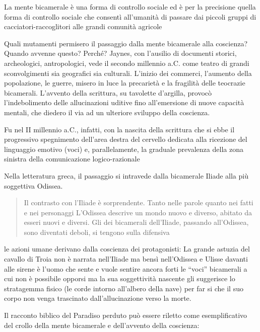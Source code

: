 La mente bicamerale è una forma di controllo sociale ed è per la precisione
quella forma di controllo sociale che consentì all’umanità di passare dai
piccoli gruppi di cacciatori-raccoglitori alle grandi comunità agricole

Quali mutamenti permisero il passaggio dalla mente bicamerale alla coscienza?
Quando avvenne questo? Perché? Jaynes, con l’ausilio di documenti storici,
archeologici, antropologici, vede il secondo millennio a.C. come teatro di
grandi sconvolgimenti sia geografici sia culturali. L’inizio dei commerci,
l’aumento della popolazione, le guerre, misero in luce la precarietà e la
fragilità delle teocrazie bicamerali. L’avvento della scrittura, su tavolette
d’argilla, provocò l’indebolimento delle allucinazioni uditive fino all’emersione
di nuove capacità mentali, che diedero il via ad un ulteriore sviluppo della
coscienza.

Fu nel II millennio a.C., infatti, con la nascita della scrittura che si ebbe
il progressivo spegnimento dell’area destra del cervello dedicata alla ricezione
del  linguaggio emotivo (voci) e, parallelamente, la graduale prevalenza della
zona sinistra della comunicazione logico-razionale

Nella  letteratura greca, il passaggio si intravede  dalla bicamerale Iliade
alla più soggettiva  Odissea.

\begin{quote}
Il contrasto con l’Iliade è sorprendente. Tanto nelle parole quanto nei fatti e
nei personaggi L’Odissea descrive un mondo nuovo e diverso, abitato da esseri
nuovi e diversi. Gli dei bicamerali dell’Iliade, passando all’Odissea, sono
diventati deboli, si tengono sulla difensiva
\end{quote}

le azioni umane derivano dalla coscienza dei protagonisti: La grande astuzia del cavallo di Troia non è narrata nell’Iliade  ma bensì nell’Odissea e Ulisse davanti alle sirene è l’uomo che sente e vuole sentire ancora forti le “voci” bicamerali
a cui non è possibile opporsi ma la sua soggettività nascente gli suggerisce lo stratagemma fisico (le corde intorno all’albero della nave) per far si che il
suo corpo non venga trascinato dall’allucinazione verso la morte.

Il racconto biblico del Paradiso perduto può essere riletto come esemplificativo
del crollo della mente bicamerale e dell'avvento della coscienza:

